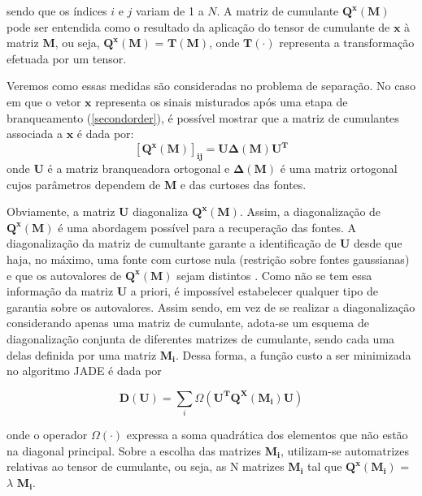     sendo que os índices $i$ e $j$ variam de 1 a $N$. A matriz de cumulante $\mathbf{Q^x(M)}$ pode ser entendida como o resultado da aplicação do tensor de cumulante de $\mathbf{x}$ à matriz $\mathbf{M}$, ou seja, $\mathbf{Q^x(M)}$ = $\mathbf{T(M)}$, onde $\mathbf{T(\cdot)}$ representa a transformação efetuada por um tensor.
    
    Veremos como essas medidas são consideradas no problema de separação. No caso em que o vetor $\mathbf{x}$ representa os sinais misturados após uma etapa de branqueamento (\ref{secondorder}), é possível mostrar \cite{ICA3} que a matriz de cumulantes associada a $\mathbf{x}$ é dada por:
    \begin{equation}
        \mathbf{[Q^x(M)]_{ij}} = \mathbf{U\Delta(M)U^T}
    \end{equation}
    onde $\mathbf{U}$ é a matriz branqueadora ortogonal e  $\mathbf{\Delta(M)}$ é uma matriz ortogonal cujos parâmetros dependem de $\mathbf{M}$ e das curtoses das fontes.

    Obviamente, a matriz $\mathbf{U}$ diagonaliza  $\mathbf{Q^x(M)}$. Assim, a diagonalização de $\mathbf{Q^x(M)}$ é uma abordagem possível para a recuperação das fontes.  A diagonalização da matriz de cumultante garante a identificação de $\mathbf{U}$ desde que haja, no máximo, uma fonte com curtose nula (restrição sobre fontes gaussianas) e que os autovalores de $\mathbf{Q^x(M)}$ sejam distintos \cite{JADE}. Como não se tem essa informação da matriz $\mathbf{U}$ a priori, é impossível estabelecer qualquer tipo de garantia sobre os autovalores.
    Assim sendo, em vez de se realizar a diagonalização considerando apenas uma matriz de cumulante, adota-se um esquema de diagonalização conjunta de diferentes matrizes de cumulante, sendo cada uma delas definida por uma matriz $\mathbf{M_i}$. Dessa forma, a função custo a ser minimizada no algoritmo JADE é dada por
    
    \begin{equation}\label{eq:optimize}
        \mathbf{D(U)} = \sum_i \Omega(\mathbf{U^TQ^X(M_i)U})
    \end{equation}
    
    onde o operador $\Omega(\cdot)$ expressa a soma quadrática dos elementos que não estão na diagonal principal. Sobre a escolha das matrizes $\mathbf{M_i}$, utilizam-se automatrizes relativas ao tensor de cumulante, ou seja, as N matrizes $\mathbf{M_i}$ tal que $\mathbf{Q^x(M_i)}$ = $\lambda$ $\mathbf{M_i}$.
    
